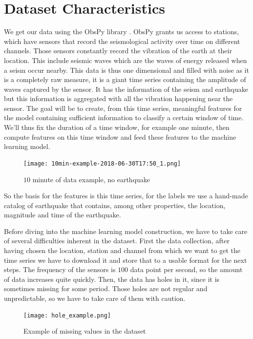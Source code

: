 \documentclass[10pt,conference,compsocconf]{IEEEtran}
\begin{document}
\section{Dataset Characteristics}
We get our data using the ObsPy library \cite{obspy}. ObsPy grants us access to stations, which have sensors that record the seismological activity over time on different channels. Those sensors constantly record  the vibration of the earth at their location. This include seismic waves which are the waves of energy released when a seism occur nearby. This data is thus one dimensional and filled with noise as it is a completely raw measure, it is a giant time series containing the amplitude of waves captured by the sensor. It has the information of the seism and earthquake but this information is aggregated with all the vibration happening near the sensor. The goal will be to create, from this time series, meaningful features for the model containing sufficient information to classify a certain window of time. We'll thus fix the duration of a time window, for example one minute, then compute features on this time window and feed these features to the machine learning model.

\begin{figure}[h]
  \centering
	\texttt{[image: 10min-example-2018-06-30T17:50\_1.png]}
  \caption{$10$ minute of data example, no earthquake}
	\label{fig:10min-example}
\end{figure}

So the basis for the features is this time series, for the labels we use a hand-made catalog of earthquake that contains, among other properties, the location, magnitude and time of the earthquake.

Before diving into the machine learning model construction, we have to take care of several difficulties inherent in the dataset.\newline
First the data collection, after having chosen the location, station and channel from which we want to get the time series we have to download it and store that to a usable format for the next steps. The frequency of the sensors is $100$ data point per second, so the amount of data increases quite quickly. Then, the data has holes in it, since it is sometimes missing for some period. Those holes are not regular and unpredictable, so we have to take care of them with caution.

\begin{figure}[h]
  \centering
	\texttt{[image: hole\_example.png]}
  \caption{Example of missing values in the dataset}
	\label{fig:10min-example}
\end{figure}
\end{document}
